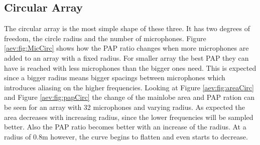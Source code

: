 \subsection{Circular Array}
The circular array is the most simple shape of these three.
It has two degrees of freedom, the circle radius and the number of microphones.
Figure \ref*{aev:fig:MicCirc} shows how the PAP ratio changes when
more microphones are added to an array with a fixed radius.
For smaller array the best PAP they can have is reached with less
microphones than the bigger ones need.
This is expected since a bigger radius means bigger spacings between microphones
which introduces aliasing on the higher frequencies.
Looking at Figure \ref*{aev:fig:areaCirc} and Figure \ref*{aev:fig:papCirc}
the change of the mainlobe area and PAP ration can be seen for
an array with 32 microphones and varying radius.
As expected the area decreases with increasing radius, since the lower frequencies will be
sampled better.
Also the PAP ratio becomes better with an increase of the radius.
At a radius of 0.8m however, the curve begins to flatten and even starts to decrease.

